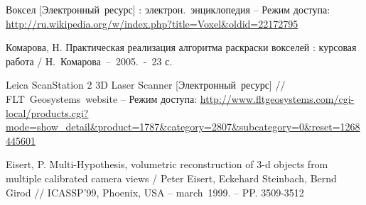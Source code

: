 \renewcommand{\refname}{Список литературы}
\begin{thebibliography}{99}

		Воксел [Электронный~ресурс] : электрон.~энциклопедия -- Режим доступа: \url{http://ru.wikipedia.org/w/index.php?title=Voxel&oldid=22172795}

			Комарова, Н. Практическая реализация алгоритма раскраски вокселей : курсовая работа / 
			Н.~Комарова~--~2005.~-~23 с.
	
	
		Leica ScanStation 2 3D Laser Scanner [Электронный~ресурс] // FLT~Geosystems~website -- Режим доступа:
		\url{http://www.fltgeosystems.com/cgi-local/products.cgi?mode=show_detail&product=1787&category=2807&subcategory=0&reset=1268445601}
	
		Eisert, P. Multi-Hypothesis, volumetric reconstruction of 3-d objects from multiple calibrated camera views /
		Peter Eisert, Eckehard Steinbach, Bernd Girod //
		ICASSP’99, Phoenix, USA -- march~1999. -- PP. 3509-3512
		
		
		
\end{thebibliography}

